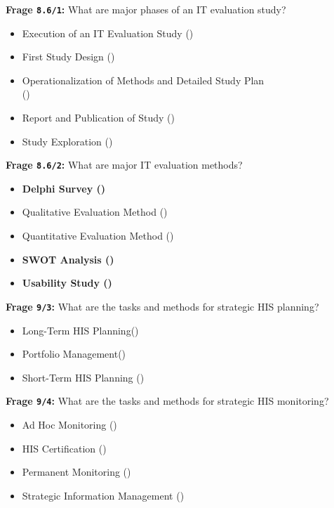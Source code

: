 \textbf{Frage \texttt{8.6/1}:} What are major phases of an IT evaluation study?

\begin{itemize}
  \item Execution of an IT Evaluation Study ()
  \item First Study Design ()
  \item Operationalization of Methods and Detailed Study Plan \\
  ()
  \item Report and Publication of Study ()
  \item Study Exploration ()
\end{itemize}

\textbf{Frage \texttt{8.6/2}:} What are major IT evaluation methods?

\begin{itemize}
  \item \textbf{ Delphi Survey ()}
  \item Qualitative Evaluation Method ()
  \item Quantitative Evaluation Method ()
  \item \textbf{ SWOT Analysis ()}
  \item \textbf{ Usability Study ()}
\end{itemize}

\textbf{Frage \texttt{9/3}:} What are the tasks and methods for strategic HIS planning?

\begin{itemize}
  \item Long-Term HIS Planning()
  \item Portfolio Management()
  \item Short-Term HIS Planning ()
\end{itemize}

\textbf{Frage \texttt{9/4}:} What are the tasks and methods for strategic HIS monitoring?

\begin{itemize}
  \item Ad Hoc Monitoring ()
  \item HIS Certification ()
  \item Permanent Monitoring ()
  \item Strategic Information Management ()
\end{itemize}

